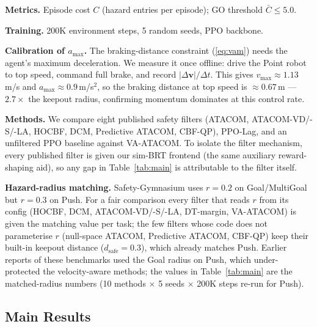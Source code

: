 \documentclass[letterpaper]{article}
\begin{document}
\textbf{Metrics.} Episode cost $C$ (hazard entries per episode); GO threshold $\bar{C} \le 5.0$.

\textbf{Training.} 200K environment steps, 5 random seeds, PPO backbone.

\textbf{Calibration of $a_{\max}$.} The braking-distance constraint (\ref{eq:vam}) needs the agent's maximum deceleration. We measure it once offline: drive the Point robot to top speed, command full brake, and record $|\Delta\boldsymbol{v}|/\Delta t$. This gives $v_{\max}\approx1.13$\,m/s and $a_{\max}\approx0.9$\,m/s$^2$, so the braking distance at top speed is $\approx0.67$\,m --- $2.7\times$ the keepout radius, confirming momentum dominates at this control rate.

\textbf{Methods.} We compare eight published safety filters (ATACOM, ATACOM-VD/-S/-LA, HOCBF, DCM, Predictive ATACOM, CBF-QP), PPO-Lag, and an unfiltered PPO baseline against VA-ATACOM. To isolate the filter mechanism, every published filter is given our sim-BRT frontend (the same auxiliary reward-shaping aid), so any gap in Table~\ref{tab:main} is attributable to the filter itself.

\textbf{Hazard-radius matching.} Safety-Gymnasium uses $r{=}0.2$ on Goal/MultiGoal but $r{=}0.3$ on Push. For a fair comparison every filter that reads $r$ from its config (HOCBF, DCM, ATACOM-VD/-S/-LA, DT-margin, VA-ATACOM) is given the matching value per task; the few filters whose code does not parameterise $r$ (null-space ATACOM, Predictive ATACOM, CBF-QP) keep their built-in keepout distance ($d_{\text{safe}}{=}0.3$), which already matches Push. Earlier reports of these benchmarks used the Goal radius on Push, which under-protected the velocity-aware methods; the values in Table~\ref{tab:main} are the matched-radius numbers (10 methods $\times$ 5 seeds $\times$ 200K steps re-run for Push).

\subsection{Main Results}
\end{document}
